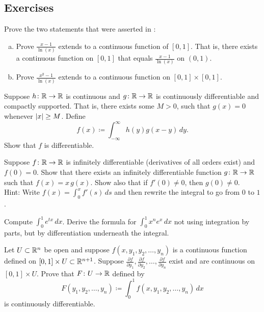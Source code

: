 \subsection{Exercises}

\begin{exercise} \label{exercise:counterexamplediffunder}
Prove the two statements that were asserted in
:
\begin{enumerate}[a)]
\item
Prove $\frac{x-1}{\ln(x)}$ extends to a continuous function of
$[0,1]$.  That is, there exists a continuous function on $[0,1]$
that equals $\frac{x-1}{\ln(x)}$ on $(0,1)$.
\item
Prove $\frac{x^y-1}{\ln(x)}$ extends to a continuous function
on $[0,1] \times [0,1]$.
\end{enumerate}
\end{exercise}

\begin{exercise}
Suppose $h \colon {\mathbb{R}} \to {\mathbb{R}}$ is continuous and $g
\colon {\mathbb{R}} \to {\mathbb{R}}$ is continuously differentiable and compactly
supported.  That is, there exists some $M > 0$, such that $g(x) = 0$ whenever
$\lvert {x} \rvert \geq M$.  Define
\begin{equation*}
f(x) \coloneqq \int_{-\infty}^\infty h(y)g(x-y)\,dy  .
\end{equation*}
Show that $f$ is differentiable.
\end{exercise}

\begin{exercise}
Suppose $f \colon {\mathbb{R}} \to {\mathbb{R}}$ is infinitely differentiable (derivatives of
all orders exist)
and $f(0) = 0$.  Show that there exists an infinitely
differentiable function $g \colon {\mathbb{R}} \to {\mathbb{R}}$ such that $f(x) = x\,g(x)$.
Show also that
if $f'(0) \neq 0$, then $g(0) \neq 0$.\\
Hint: Write
$f(x) = \int_0^x f'(s) \,ds$ and then rewrite the integral to go
from $0$ to $1$.
\end{exercise}

\begin{exercise}
Compute $\int_0^1 e^{tx} \,dx$.  Derive the formula for
$\int_0^1 x^n e^{x} \,dx$ not using integration by parts, but
by differentiation underneath the integral.
\end{exercise}

\begin{exercise}
Let $U \subset {\mathbb{R}}^n$ be open and suppose
$f(x,y_1,y_2,\ldots,y_n)$ is a continuous
function defined on $[0,1] \times U \subset {\mathbb{R}}^{n+1}$.
Suppose
$\frac{\partial f}{\partial y_1},
\frac{\partial f}{\partial y_2},\ldots,
\frac{\partial f}{\partial y_n}$
exist and are continuous on $[0,1] \times U$.
Prove that $F \colon U \to {\mathbb{R}}$ defined by
\begin{equation*}
F(y_1,y_2,\ldots,y_n) \coloneqq
\int_0^1
f(x,y_1,y_2,\ldots,y_n)
\, dx
\end{equation*}
is continuously differentiable.
\end{exercise}

